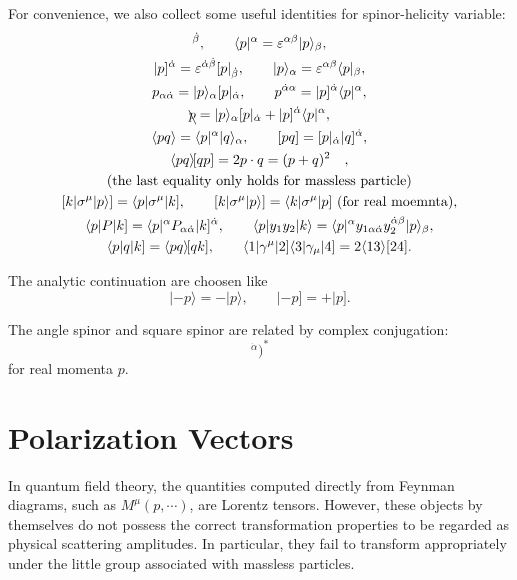 \documentclass[12pt]{article}
\numberwithin{equation}{section}
\newcommand{\avg}[1]{\langle #1 \rangle}
\newcommand{\aket}[1]{|#1\rangle}
\newcommand{\sket}[1]{|#1]}
\newcommand{\cbrak}[2]{\avg{#1}\![#2]}
\newcommand{\asbra}[3]{\langle #1 | #2 |#3 ]}
\newcommand{\casbra}[3]{[ #1 | #2 | #3 \rangle]}
\begin{document}
For convenience, we also collect some useful identities for spinor-helicity variable:
\begin{gather}
    [p|_{\dot{\alpha}}=\varepsilon _{\dot{\alpha}\dot{\beta}}\sket{p}^{\dot{\beta}},\qquad \langle p|^\alpha=\varepsilon^{\alpha\beta}\aket{p}_{\beta}, \notag \\
    \sket{p}^{\dot{\alpha}}=\varepsilon^{\dot{\alpha}\dot{\beta}}[p|_{\dot{\beta}},\qquad \aket{p}_\alpha=\varepsilon^{\alpha\beta}\langle p|_\beta, \notag \\
    p_{\alpha\dot{\alpha}}=\aket{p}_\alpha[p|_{\dot{\alpha}},\qquad p^{\dot{\alpha}\alpha}=\sket{p}^{\dot{\alpha}}\langle p|^{\alpha}, \notag \\
    \bcancel{p}=\aket{p}_\alpha[p|_{\dot{\alpha}}+\sket{p}^{\dot{\alpha}}\langle p|^{\alpha}, \notag \\
    \avg{pq}=\langle p|^{\alpha}\aket{q}_{\alpha},\qquad [pq]=[p|_{\dot{\alpha}}\sket{q}^{\dot{\alpha}}, \notag \\
    \cbrak{pq}{qp}=2p\cdot q= (p+q)^2 \quad , \notag \\
    (\text{the last equality only holds for massless particle}) \notag \\
    \casbra{k}{\sigma^\mu}{p}=\asbra{p}{\sigma^\mu}{k},\qquad \casbra{k}{\sigma^\mu}{p}=\asbra{k}{\sigma^\mu}{p} ~(\text{for real moemnta}), \notag \\
    \asbra{p}{P}{k}=\langle p|^\alpha P_{\alpha\dot{\alpha}}|k]^{\dot{\alpha}},\qquad \avg{p|y_1y_2|k}=\langle p|^\alpha y_{1\alpha\dot{\alpha}}y_2^{\dot{\alpha}\beta}|p\rangle_\beta, \notag \\
    \asbra{p}{q}{k}=\cbrak{pq}{qk},\qquad \langle 1 | \gamma^\mu | 2 ] \langle 3 | \gamma_\mu | 4 ] = 2 \langle 13 \rangle [24].
\end{gather}

 The analytic continuation are choosen like 
 \begin{equation}
    \aket{-p}=-\aket{p},\qquad \sket{-p}=+\sket{p}.
 \end{equation}

 The angle spinor and square spinor are related by complex conjugation:
 \begin{equation}
        [p|_{\dot{\alpha}}=(\aket{p}_\alpha)^*,\qquad \langle p|^{\alpha}=(\sket{p}^{\dot{\alpha}})^*
 \end{equation}
for real momenta $p$. 

\section{Polarization Vectors}
In quantum field theory, the quantities computed directly from Feynman diagrams, such as \( M^\mu(p, \cdots) \), are Lorentz tensors. However, these objects by themselves do not possess the correct transformation properties to be regarded as physical scattering amplitudes. In particular, they fail to transform appropriately under the little group associated with massless particles.
\end{document}

